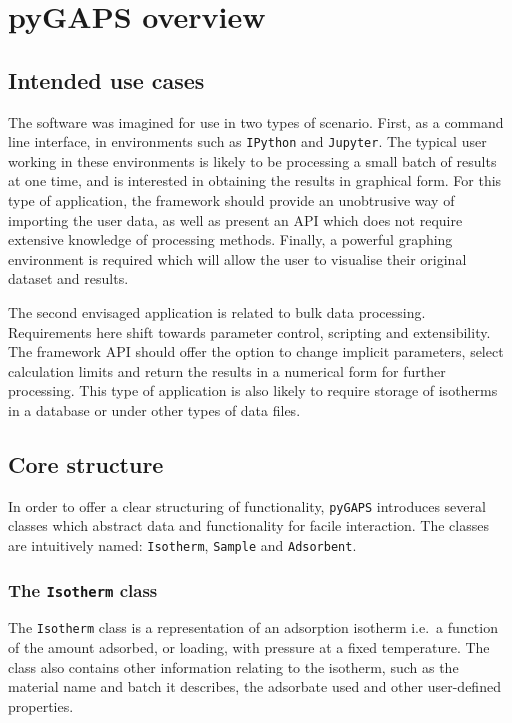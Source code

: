 
\section{pyGAPS overview}

\subsection{Intended use cases}

The software was imagined for use in two types of scenario.
First, as a command line interface, in environments such as
\texttt{IPython} and \texttt{Jupyter}. The typical user working
in these environments is likely to be processing a small batch of
results at one time, and is interested in obtaining the results in
graphical form. For this type of application, the framework should
provide an unobtrusive way of importing the user data, as well as
present an API which does not require extensive knowledge of 
processing methods. Finally, a powerful graphing environment is
required which will allow the user to visualise their original
dataset and results.

The second envisaged application is related to bulk data processing.
Requirements here shift towards parameter control, scripting and
extensibility. The framework API should offer the option to change 
implicit parameters, select calculation limits and return the results
in a numerical form for further processing. This type of application 
is also likely to require storage of isotherms in a database or
under other types of data files.

\subsection{Core structure}

In order to offer a clear structuring of functionality, 
\texttt{pyGAPS} introduces several classes which abstract data and
functionality for facile interaction. The classes are
intuitively named: \texttt{Isotherm}, \texttt{Sample} and \texttt{Adsorbent}.

\subsubsection{The \texttt{Isotherm} class}

The \texttt{Isotherm} class is a representation of an adsorption 
isotherm i.e.\ a function of the amount adsorbed, or loading, 
with pressure at a fixed temperature. The class also contains
other information relating to the isotherm, such as the material
name and batch it describes, the adsorbate used and other 
user-defined properties.

